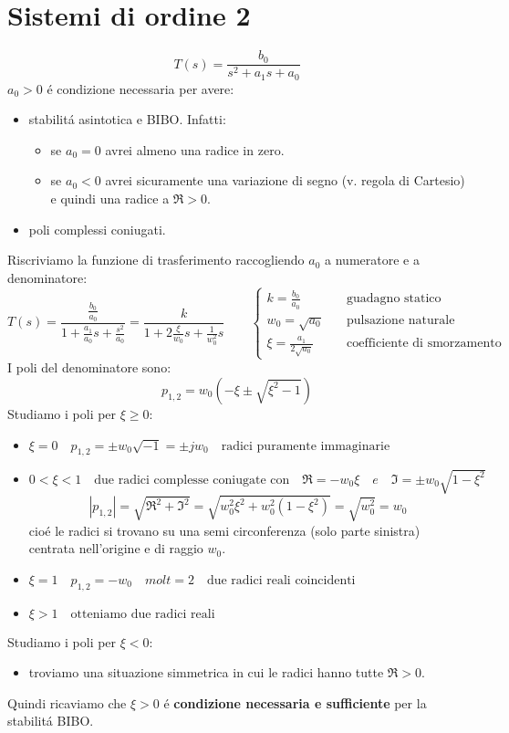 \documentclass[../main.tex]{subfiles}
\begin{document}
	\section{Sistemi di ordine 2}
	\[ T(s) = \frac{b_0}{s^2+a_1s+a_0} \]
	$ a_0 > 0 $ \'e condizione necessaria per avere:
	\begin{itemize}
		\item stabilit\'a asintotica e BIBO. Infatti:
		\begin{itemize}
			\item se $ a_0 = 0 $ avrei almeno una radice in zero.
			\item se $ a_0 < 0 $ avrei sicuramente una variazione di segno (v. regola di Cartesio) e quindi una radice a $ \Re>0 $.
		\end{itemize}
		\item poli complessi coniugati.
	\end{itemize}
	Riscriviamo la funzione di trasferimento raccogliendo $ a_0 $ a numeratore e a denominatore:
	\[ T(s) = \frac{\frac{b_0}{a_0}}{1+\frac{a_1}{a_0}s+\frac{s^2}{a_0}} = \frac{k}{1+2\frac{\xi}{w_0}s+\frac{1}{w_0^2}s}  \qquad
		\begin{cases}
			k = \frac{b_0}{a_0} \quad &\text{guadagno statico}\\
			w_0 = \sqrt{a_0} \quad &\text{pulsazione naturale}\\
			\xi = \frac{a_1}{2\sqrt{a_0}} \quad &\text{coefficiente di smorzamento}
		\end{cases}
	\]
	I poli del denominatore sono:
	\[ p_{1,2} = w_0(-\xi \pm \sqrt{\xi^2-1}) \]
	Studiamo i poli per $ \xi \geq 0 $:
	\begin{itemize}
		\item $ \xi = 0 \quad p_{1,2} =\pm w_0 \sqrt{-1} = \pm jw_0 \quad \text{radici puramente immaginarie}$
		\item $ 0 < \xi < 1 \quad \text{due radici complesse coniugate con} \quad \Re = -w_0\xi \quad e \quad \Im = \pm w_0 \sqrt{1-\xi^2} $
		\[ \left| p_{1,2} \right| = \sqrt{\Re^2 + \Im^2} = \sqrt{w_0^2\xi^2 + w_0^2(1-\xi^2)} = \sqrt{w_0^2} = w_0 \]
		cio\'e le radici si trovano su una semi circonferenza (solo parte sinistra) centrata nell'origine e di raggio $ w_0 $.
		\item $ \xi = 1 \quad p_{1,2} = -w_0 \quad molt=2 \quad \text{due radici reali coincidenti} $
		\item $ \xi > 1 \quad \text{otteniamo due radici reali} $
	\end{itemize}
	\smallskip
	Studiamo i poli per $ \xi < 0 $:
	\begin{itemize}
		\item troviamo una situazione simmetrica in cui le radici hanno tutte $ \Re > 0 $.
	\end{itemize}
	Quindi ricaviamo che $ \xi > 0 $ \'e \textbf{condizione necessaria e sufficiente} per la stabilit\'a BIBO.
\end{document}
